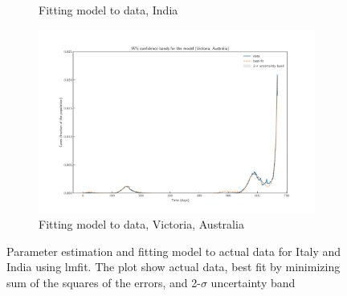 \documentclass[10pt]{wlscirep}
\begin{document}
\begin{figure}[t!]
\begin{subfigure}{0.3\textwidth}
		\caption{Fitting model to data, India}
		\label{fig-fitness-1B}
	\end{subfigure}
\begin{subfigure}{0.3\textwidth}
	\centering
	\includegraphics[width=\linewidth]{Victoria_model_confidence.pdf}
	\caption{Fitting model to data, Victoria, Australia}
	\label{fig-fitness-1C}
\end{subfigure}
	\caption{Parameter estimation and fitting model to actual data for Italy and India using lmfit. The plot show actual data, best fit by minimizing sum of the squares of the errors, and 2-$\sigma$ uncertainty band  }
	\label{fig-fitness-1}
\end{figure}
\end{document}
